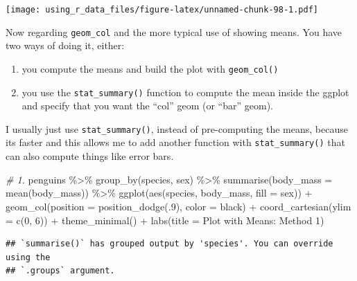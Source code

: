 \documentclass[
]{book}
\newenvironment{Shaded}{\begin{snugshade}}{\end{snugshade}}
\newcommand{\AttributeTok}[1]{\textcolor[rgb]{0.77,0.63,0.00}{#1}}
\newcommand{\CommentTok}[1]{\textcolor[rgb]{0.56,0.35,0.01}{\textit{#1}}}
\newcommand{\DecValTok}[1]{\textcolor[rgb]{0.00,0.00,0.81}{#1}}
\newcommand{\FunctionTok}[1]{\textcolor[rgb]{0.00,0.00,0.00}{#1}}
\newcommand{\NormalTok}[1]{#1}
\newcommand{\SpecialCharTok}[1]{\textcolor[rgb]{0.00,0.00,0.00}{#1}}
\newcommand{\StringTok}[1]{\textcolor[rgb]{0.31,0.60,0.02}{#1}}
\begin{document}
\texttt{[image: using\_r\_data\_files/figure-latex/unnamed-chunk-98-1.pdf]}

Now regarding \texttt{geom\_col} and the more typical use of showing means.
You have two ways of doing it, either:

\begin{enumerate}
\def\labelenumi{\arabic{enumi}.}
\item
  you compute the means and build the plot with \texttt{geom\_col()}
\item
  you use the \texttt{stat\_summary()} function to compute the mean inside the ggplot and specify that you want the ``col'' geom (or ``bar'' geom).
\end{enumerate}

I usually just use \texttt{stat\_summary()}, instead of pre-computing the means, because its faster and this allows me to add another function with \texttt{stat\_summary()} that can also compute things like error bars.

\begin{Shaded}
\begin{Highlighting}[]
\CommentTok{\# 1. }
\NormalTok{penguins }\SpecialCharTok{\%\textgreater{}\%} 
  \FunctionTok{group\_by}\NormalTok{(species, sex) }\SpecialCharTok{\%\textgreater{}\%} 
  \FunctionTok{summarise}\NormalTok{(}\AttributeTok{body\_mass =} \FunctionTok{mean}\NormalTok{(body\_mass)) }\SpecialCharTok{\%\textgreater{}\%} 
  \FunctionTok{ggplot}\NormalTok{(}\FunctionTok{aes}\NormalTok{(species, body\_mass, }\AttributeTok{fill =}\NormalTok{ sex)) }\SpecialCharTok{+}
  \FunctionTok{geom\_col}\NormalTok{(}\AttributeTok{position =} \FunctionTok{position\_dodge}\NormalTok{(.}\DecValTok{9}\NormalTok{), }\AttributeTok{color =} \StringTok{\textquotesingle{}black\textquotesingle{}}\NormalTok{) }\SpecialCharTok{+}
  \FunctionTok{coord\_cartesian}\NormalTok{(}\AttributeTok{ylim =} \FunctionTok{c}\NormalTok{(}\DecValTok{0}\NormalTok{, }\DecValTok{6}\NormalTok{)) }\SpecialCharTok{+} 
  \FunctionTok{theme\_minimal}\NormalTok{() }\SpecialCharTok{+} 
  \FunctionTok{labs}\NormalTok{(}\AttributeTok{title =} \StringTok{\textquotesingle{}Plot with Means: Method 1\textquotesingle{}}\NormalTok{)}
\end{Highlighting}
\end{Shaded}

\begin{verbatim}
## `summarise()` has grouped output by 'species'. You can override using the
## `.groups` argument.
\end{verbatim}
\end{document}
